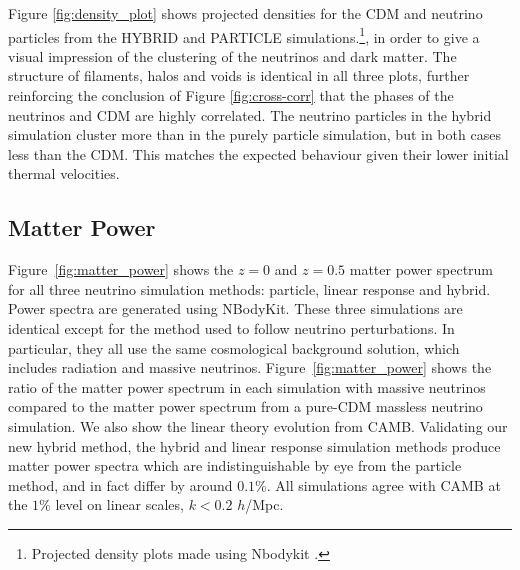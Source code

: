 \documentclass[useAMS, usenatbib]{mnras}
\begin{document}
Figure \ref{fig:density_plot} shows projected densities for the CDM and neutrino particles from the HYBRID and PARTICLE simulations.\footnote{Projected density plots made using Nbodykit \citep{Hand_2017}.}, in order to give a visual impression of the clustering of the neutrinos and dark matter. The structure of filaments, halos and voids is identical in all three plots, further reinforcing the conclusion of Figure \ref{fig:cross-corr} that the phases of the neutrinos and CDM are highly correlated. The neutrino particles in the hybrid simulation cluster more than in the purely particle simulation, but in both cases less than the CDM. This matches the expected behaviour given their lower initial thermal velocities.

\subsection{Matter Power}
\label{sec:matterpower}

Figure~\ref{fig:matter_power} shows the $z=0$ and $z=0.5$ matter power spectrum for all three neutrino simulation methods: particle, linear response and hybrid. Power spectra are generated using NBodyKit. These three simulations are identical except for the method used to follow neutrino perturbations. In particular, they all use the same cosmological background solution, which includes radiation and massive neutrinos. Figure~\ref{fig:matter_power} shows the ratio of the matter power spectrum in each simulation with massive neutrinos compared to the matter power spectrum from a pure-CDM massless neutrino simulation. We also show the linear theory evolution from CAMB. Validating our new hybrid method, the hybrid and linear response simulation methods produce matter power spectra which are indistinguishable by eye from the particle method, and in fact differ by around $0.1\%$. All simulations agree with CAMB at the $1\%$ level on linear scales, $k < 0.2$ $h$/Mpc.
\end{document}
